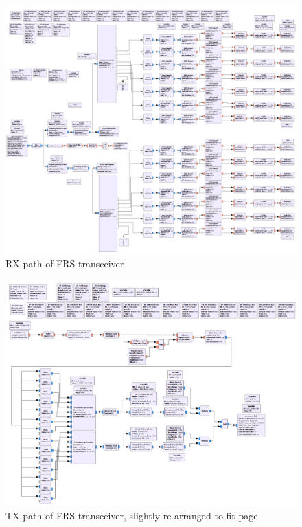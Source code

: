 \newpage
\begin{figure}[h!]
  \label{fig:rx_flowgraph}
  \centering
  \includegraphics[width=6.5in]{images/frs/bladeRF_frs_rx_grc.png}
  \caption{RX path of FRS transceiver}
\end{figure}

\newpage
\begin{figure}[h!]
  \label{fig:tx_flowgraph}
  \centering
  \includegraphics[width=6.5in]{images/frs/bladeRF_frs_tx_grc.png}
  \caption{TX path of FRS transceiver, slightly re-arranged to fit page}
\end{figure}

\newpage
{\footnotesize \bib}

